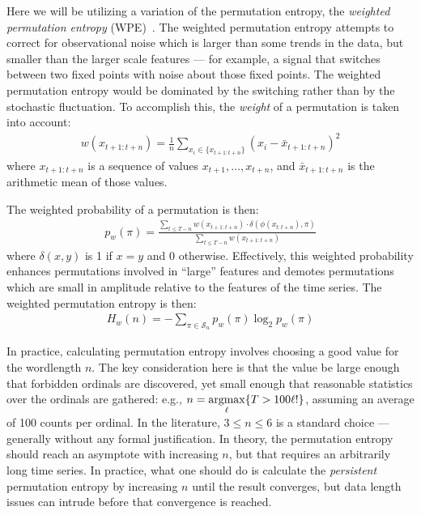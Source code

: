 \documentclass{article}
\begin{document}
Here we will be utilizing a variation of the permutation entropy, the
\emph{weighted permutation entropy} (WPE)~\cite{fadlallah2013}. The weighted
permutation entropy attempts to correct for observational noise which is larger
than some trends in the data, but smaller than the larger scale features --- for
example, a signal that switches between two fixed points with noise about those
fixed points. The weighted permutation entropy would be dominated by the
switching rather than by the stochastic fluctuation. To accomplish this, the
\emph{weight} of a permutation is taken into account:
\begin{align*}
  w(x_{t+1:t+n}) = \frac{1}{n}
                 \sum_{x_i \in \{x_{t+1:t+n}\}}
                 \left( x_i - \bar{x}_{t+1:t+n} \right)^2
\end{align*}
where $x_{t+1:t+n}$ is a sequence of values $x_{t+1}, \ldots, x_{t+n}$, and
$\bar{x}_{t+1:t+n}$ is the arithmetic mean of those values.

The weighted probability of a permutation is then:
\begin{align*}
  p_w(\pi) = \frac{\displaystyle \sum_{t \le T - n} w(x_{t+1:t+n}) \cdot \delta(\phi(x_{t:t+n}), \pi) }{\displaystyle \sum_{t \le T - n} w(x_{t+1:t+n})}
\end{align*}
where $\delta(x, y)$ is 1 if $x = y$ and 0 otherwise. Effectively, this weighted
probability enhances permutations involved in ``large'' features and demotes
permutations which are small in amplitude relative to the features of the time
series. The weighted permutation entropy is then:
\begin{align*}
  H_w(n) = - \sum_{\pi \in \mathcal{S}_n} p_w(\pi) \log_2 p_w(\pi)
\end{align*}

In practice, calculating permutation entropy involves choosing a good value for
the wordlength $n$. The key consideration here is that the value be large enough
that forbidden ordinals are discovered, yet small enough that reasonable
statistics over the ordinals are gathered: e.g., $\displaystyle n =
\operatornamewithlimits{argmax}_\ell\{T > 100 \ell!\}$, assuming an average of
100 counts per ordinal. In the literature, $3\le n \le 6$ is a standard choice
---generally without any formal justification. In theory, the permutation
entropy should reach an asymptote with increasing $n$, but that requires an
arbitrarily long time series. In practice, what one should do is calculate the
\emph{persistent} permutation entropy by increasing $n$ until the result
converges, but data length issues can intrude before that convergence is
reached.
\end{document}
